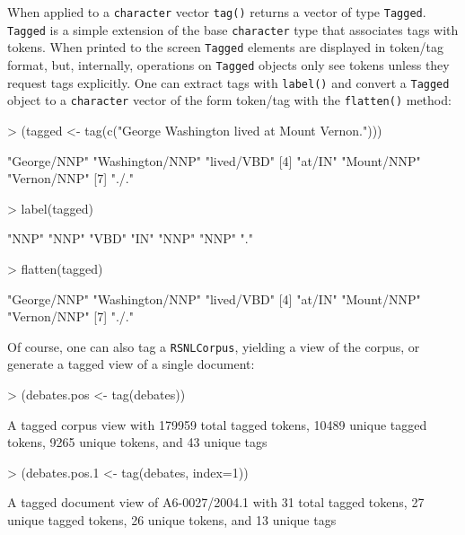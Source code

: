 \documentclass[11pt]{article}
\let\code=\texttt
\let\rclass=\texttt
\begin{document}
When applied to a \code{character} vector \code{tag()} returns a
vector of type \rclass{Tagged}.  \rclass{Tagged} is a simple extension
of the base \code{character} type that associates tags with tokens.
When printed to the screen \rclass{Tagged} elements are displayed in
token/tag format, but, internally, operations on \rclass{Tagged}
objects only see tokens unless they request tags explicitly.  One can
extract tags with \code{label()} and convert a \rclass{Tagged} object
to a \code{character} vector of the form token/tag with the
\code{flatten()} method:
\begin{Schunk}
\begin{Sinput}
> (tagged <- tag(c("George Washington lived at Mount Vernon.")))
\end{Sinput}
\begin{Soutput}
[1] "George/NNP"     "Washington/NNP" "lived/VBD"     
[4] "at/IN"          "Mount/NNP"      "Vernon/NNP"    
[7] "./."           
\end{Soutput}
\begin{Sinput}
> label(tagged)
\end{Sinput}
\begin{Soutput}
[1] "NNP" "NNP" "VBD" "IN"  "NNP" "NNP" "."  
\end{Soutput}
\begin{Sinput}
> flatten(tagged)
\end{Sinput}
\begin{Soutput}
[1] "George/NNP"     "Washington/NNP" "lived/VBD"     
[4] "at/IN"          "Mount/NNP"      "Vernon/NNP"    
[7] "./."           
\end{Soutput}
\end{Schunk}
Of course, one can also tag a \rclass{RSNLCorpus}, yielding a
view of the corpus, or generate a tagged view of a single document:
\begin{Schunk}
\begin{Sinput}
> (debates.pos <- tag(debates))
\end{Sinput}
\begin{Soutput}
A tagged corpus view with 179959 total tagged tokens,
 10489 unique tagged tokens, 9265 unique tokens, and 43 unique tags
\end{Soutput}
\begin{Sinput}
> (debates.pos.1 <- tag(debates, index=1))
\end{Sinput}
\begin{Soutput}
A tagged document view of A6-0027/2004.1 with 31 total tagged tokens,
 27 unique tagged tokens, 26 unique tokens, and 13 unique tags
\end{Soutput}
\end{Schunk}
\end{document}
